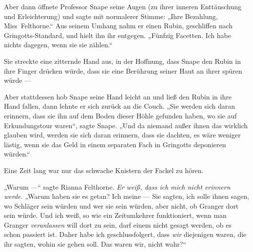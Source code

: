 Aber dann öffnete Professor Snape seine Augen (zu ihrer inneren Enttäuschung und Erleichterung) und sagte mit normalerer Stimme:
„Ihre Bezahlung, Miss~Felthorne.“ Aus seinem Umhang nahm er einen Rubin, geschliffen nach Gringotts-Standard, und hielt ihn ihr entgegen.
„Fünfzig Facetten. Ich habe nichts dagegen, wenn sie sie zählen.“

Sie streckte eine zitternde Hand aus, in der Hoffnung, dass Snape den Rubin in ihre Finger drücken würde, dass sie eine Berührung seiner Haut an ihrer spüren würde —

Aber stattdessen hob Snape seine Hand leicht an und ließ den Rubin in ihre Hand fallen, dann lehnte er sich zurück an die Couch.
„Sie werden sich daran erinnern, dass sie ihn auf dem Boden dieser Höhle gefunden haben, wo sie auf Erkundungstour waren“, sagte Snape.
„Und da niemand außer ihnen das wirklich glauben wird, werden sie sich daran erinnern, dass sie dachten, es wäre weniger lästig, wenn sie das Geld in einem separaten Fach in Gringotts deponieren würden.“

Eine Zeit lang war nur das schwache Knistern der Fackel zu hören.

„Warum —“ sagte Rianna Felthorne. \emph{Er weiß, dass ich mich nicht erinnern werde.}
„Warum haben sie es getan? Ich meine — Sie sagten, ich solle ihnen sagen, wo Schläger sein würden und wer sie sein würden, aber nicht, ob Granger dort sein würde. Und ich weiß, so wie ein Zeitumkehrer funktioniert, wenn man Granger \emph{veranlassen} will dort zu sein, darf einem nicht gesagt werden, ob es schon passiert ist. Daher habe ich geschlussfolgert, dass \emph{wir} diejenigen waren, die ihr sagten, wohin sie gehen soll. Das waren wir, nicht wahr?“

